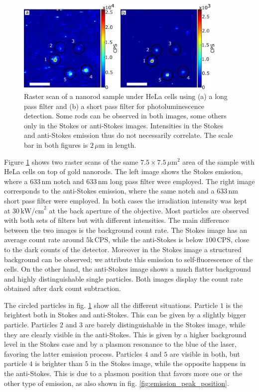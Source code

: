 \documentclass[journal=nalefd,manuscript=letter]{achemso}
\newcommand{\nm}{\ensuremath{\,\textrm{nm}}}
\newcommand{\um}{\ensuremath{\,\mu\textrm{m}}}
\newcommand{\pwr}{\ensuremath{\,\textrm{kW/cm}^2}}
\newcommand{\CPS}{\ensuremath{\,\textrm{CPS}}}
\begin{document}
\begin{figure}[htp] \centering
\includegraphics[width=0.9\textwidth]{Figures/04_Stokes_AS/stokes_as_no_dye.png}
\caption{Raster scan of a nanorod sample under HeLa cells using (a) a long pass
filter and (b) a short pass filter for photoluminescence detection.
Some rods can be observed in both images, some others only in the Stokes or
anti-Stokes images. Intensities in the Stokes and anti-Stokes emission thus do
not necessarily correlate. The scale bar in both figures is $2\um$ in length.}
	\label{fig:stokes_as_no_dye}
\end{figure}

Figure \ref{fig:stokes_as_no_dye} shows two raster scans of the same
$7.5\times7.5\um^2$ area of the sample with HeLa cells on top of gold nanorods.
The left image shows the Stokes emission, where a $633\nm$ notch and $633\nm$
long pass filter were employed. The right image corresponds to the anti-Stokes
emission, where the same notch and a $633\nm$ short pass filter were employed.
In both cases the irradiation intensity was kept at $30\pwr$ at the back
aperture of the objective. Most particles are observed with both sets of filters
but with different intensities. The main difference between the two images is
the background count rate. The Stokes image has an average count rate around
$5\textrm{k}\CPS$, while the anti-Stokes is below $100\CPS$, close to the dark
counts of the detector. Moreover in the Stokes image a structured background can
be observed; we attribute this emission to self-fluorescence of the cells. On
the other hand, the anti-Stokes image shows a much flatter background and highly
distinguishable single particles. Both images display the count rate
obtained after dark count subtraction.

The circled particles in fig. \ref{fig:stokes_as_no_dye} show all the different
situations. Particle $1$ is the brightest both in Stokes and anti-Stokes. This
can be given by a slightly bigger particle. Particles $2$ and $3$ are barely
distinguishable in the Stokes image, while they are clearly visible in the
anti-Stokes. This is given by a higher background level in the Stokes case and
by a plasmon resonance to the blue of the laser, favoring the latter emission
process. Particles $4$ and $5$ are visible in both, but particle $4$ is brighter
than $5$ in the Stokes image, while the opposite happens in the anti-Stokes.
This is due to a plasmon position that favors more one or the other type of
emission, as also shown in fig. \ref{fig:emission_peak_position}.
\end{document}
